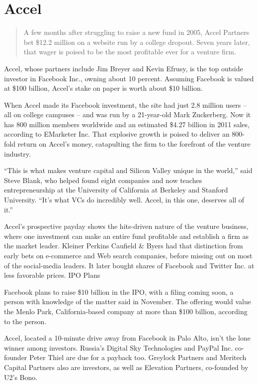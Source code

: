 \documentclass[letterpaper,12pt,english]{sphinxmanual}
\begin{document}
\chapter{Accel}
\label{chapters/chapter2::doc}\label{chapters/chapter2:accel}\label{chapters/chapter2:id1}\begin{quote}

A few months after struggling to raise a new fund in 2005, Accel Partners bet \$12.2 million on a website run by a college dropout. Seven years later, that wager is poised to be the most profitable ever for a venture firm.
\end{quote}

Accel, whose partners include Jim Breyer and Kevin Efrusy, is the top outside investor in Facebook Inc., owning about 10 percent. Assuming Facebook is valued at \$100 billion, Accel’s stake on paper is worth about \$10 billion.

When Accel made its Facebook investment, the site had just 2.8 million users -- all on college campuses -- and was run by a 21-year-old Mark Zuckerberg. Now it has 800 million members worldwide and an estimated \$4.27 billion in 2011 sales, according to EMarketer Inc. That explosive growth is poised to deliver an 800-fold return on Accel’s money, catapulting the firm to the forefront of the venture industry.

“This is what makes venture capital and Silicon Valley unique in the world,” said Steve Blank, who helped found eight companies and now teaches entrepreneurship at the University of California at Berkeley and Stanford University. “It’s what VCs do incredibly well. Accel, in this one, deserves all of it.”

Accel’s prospective payday shows the hits-driven nature of the venture business, where one investment can make an entire fund profitable and establish a firm as the market leader. Kleiner Perkins Caufield \& Byers had that distinction from early bets on e-commerce and Web search companies, before missing out on most of the social-media leaders. It later bought shares of Facebook and Twitter Inc. at less favorable prices.
IPO Plans

Facebook plans to raise \$10 billion in the IPO, with a filing coming soon, a person with knowledge of the matter said in November. The offering would value the Menlo Park, California-based company at more than \$100 billion, according to the person.

Accel, located a 10-minute drive away from Facebook in Palo Alto, isn’t the lone winner among investors. Russia’s Digital Sky Technologies and PayPal Inc. co-founder Peter Thiel are due for a payback too. Greylock Partners and Meritech Capital Partners also are investors, as well as Elevation Partners, co-founded by U2’s Bono.
\end{document}
